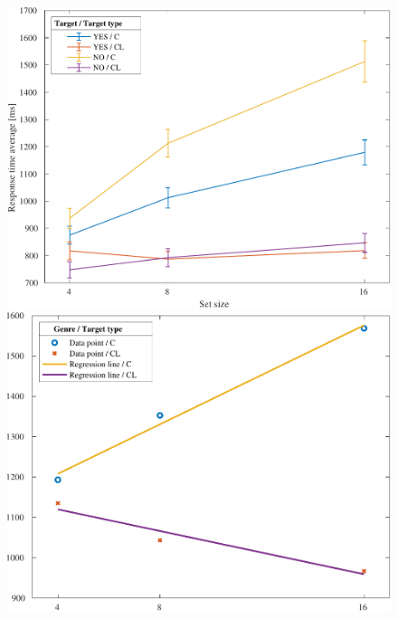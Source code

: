 \begin{figure}[H]
\begin{minipage}{.24\textwidth}
    \end{minipage}
    \begin{minipage}{.24\textwidth}
        \centering
        \includegraphics[keepaspectratio,width=\textwidth]{../../Figures/14_01_graph.pdf}
    \end{minipage}
    \begin{minipage}{.24\textwidth}
        \centering
        \includegraphics[keepaspectratio,width=\textwidth]{../../Figures/14_02_graph.pdf}
    \end{minipage}
\end{figure}